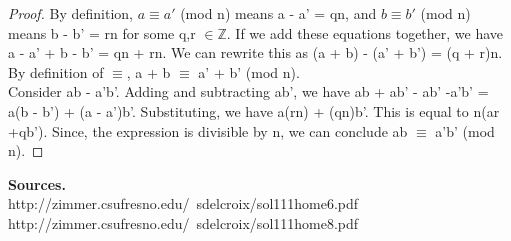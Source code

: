 \documentclass[12pt]{amsart}
\newcommand{\Z}{\mathbb{Z}}
\begin{document}
\begin{proof}
	By definition, $a \equiv a'$ (mod n) means a - a' = qn, and $b \equiv b'$ (mod n) means b - b' = rn for some q,r $\in \Z$. If we add these equations together, we have a - a' + b - b' = qn + rn. We can rewrite this as (a + b) - (a' + b') = (q + r)n. By definition of $\equiv$, a + b $\equiv$ a' + b' (mod n).
	\\\indent Consider ab - a'b'. Adding and subtracting ab', we have ab + ab' - ab' -a'b' = a(b - b') + (a - a')b'. Substituting, we have a(rn) + (qn)b'. This is equal to n(ar +qb'). Since, the expression is divisible by n, we can conclude ab $\equiv$ a'b' (mod n).
\end{proof}

\noindent\textbf{Sources.}
	\\http://zimmer.csufresno.edu/~sdelcroix/sol111home6.pdf
	\\http://zimmer.csufresno.edu/~sdelcroix/sol111home8.pdf
\end{document}
